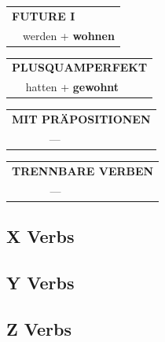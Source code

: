 \documentclass[10pt,a4paper]{revtex4-2}
\begin{document}
\begin{verbbox}
\begin{tabular}{rl}
    \multicolumn{2}{l}{\textbf{FUTURE I} }\\
  &  werden + \textbf{wohnen}\\
 
  \end{tabular}
\hfill
   \begin{tabular}{rl}
      \multicolumn{2}{l}{\textbf{PLUSQUAMPERFEKT}}\\
   & hatten + \textbf{gewohnt}\\
  \end{tabular}
  
  \vspace{10pt}



\begin{tabular}{lll}
\multicolumn{3}{l}{\textbf{MIT PRÄPOSITIONEN}}\\
& ---\\
\end{tabular}
\hfill
\begin{tabular}{lll}
\multicolumn{3}{l}{\textbf{TRENNBARE VERBEN}}\\
& ---\\
\end{tabular}

  \vspace{-5pt}

\end{verbbox}

\subsection{X Verbs}

\subsection{Y Verbs}

\subsection{Z Verbs}
\end{document}
